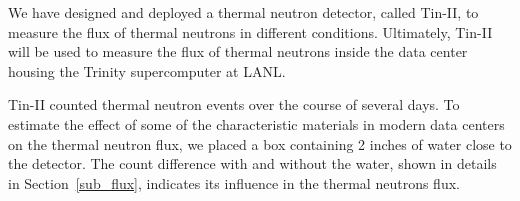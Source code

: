 We have designed and deployed a thermal neutron detector, called Tin-II, to measure the flux of thermal neutrons in different conditions. Ultimately, Tin-II will be used to measure the flux of thermal neutrons inside the data center housing the Trinity supercomputer at LANL. %


Tin-II counted thermal neutron events over the course of several days. To estimate the effect of some of the characteristic materials in modern data centers on the thermal neutron flux, we placed a box containing 2 inches of water close to the detector. The count difference with and without the water, shown in details in Section~\ref{sub_flux}, indicates its influence in the thermal neutrons flux.


